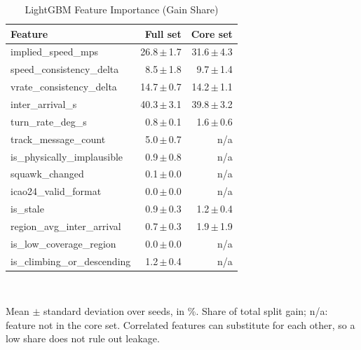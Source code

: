\begin{table}[t]
\centering
\footnotesize
\caption{LightGBM Feature Importance (Gain Share)}
\label{tab:importance}
\setlength{\tabcolsep}{4pt}
\begin{tabular}{lrr}
\toprule
Feature & Full set & Core set \\
\midrule
implied\_speed\_mps & 26.8{\,}$\pm${\,}1.7 & 31.6{\,}$\pm${\,}4.3 \\
speed\_consistency\_delta & 8.5{\,}$\pm${\,}1.8 & 9.7{\,}$\pm${\,}1.4 \\
vrate\_consistency\_delta & 14.7{\,}$\pm${\,}0.7 & 14.2{\,}$\pm${\,}1.1 \\
inter\_arrival\_s & 40.3{\,}$\pm${\,}3.1 & 39.8{\,}$\pm${\,}3.2 \\
turn\_rate\_deg\_s & 0.8{\,}$\pm${\,}0.1 & 1.6{\,}$\pm${\,}0.6 \\
track\_message\_count & 5.0{\,}$\pm${\,}0.7 & n/a \\
is\_physically\_implausible & 0.9{\,}$\pm${\,}0.8 & n/a \\
squawk\_changed & 0.1{\,}$\pm${\,}0.0 & n/a \\
icao24\_valid\_format & 0.0{\,}$\pm${\,}0.0 & n/a \\
is\_stale & 0.9{\,}$\pm${\,}0.3 & 1.2{\,}$\pm${\,}0.4 \\
region\_avg\_inter\_arrival & 0.7{\,}$\pm${\,}0.3 & 1.9{\,}$\pm${\,}1.9 \\
is\_low\_coverage\_region & 0.0{\,}$\pm${\,}0.0 & n/a \\
is\_climbing\_or\_descending & 1.2{\,}$\pm${\,}0.4 & n/a \\
\bottomrule
\end{tabular}
\\[2pt]
\parbox{\linewidth}{\scriptsize Mean $\pm$ standard deviation over  seeds, in \%. Share of total split gain; n/a: feature not in the core set. Correlated features can substitute for each other, so a low share does not rule out leakage.}
\end{table}

